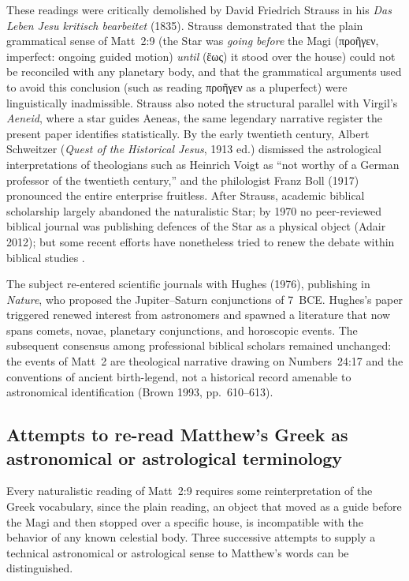 \documentclass[11pt,a4paper]{article}
\newcommand{\grk}[1]{{\fontencoding{LGR}\selectfont #1}}
\newcommand{\grk}[1]{{\greekfont #1}}
\begin{document}
These readings were critically demolished by David Friedrich Strauss in his
\textit{Das Leben Jesu kritisch bearbeitet} (1835)\cite{strauss1835}. Strauss demonstrated
that the plain grammatical sense of Matt~2:9 (the Star was \emph{going before} the Magi
(\grk{προῆγεν}, imperfect: ongoing guided motion) \emph{until} (\grk{ἕως}) it stood over
the house) could not be reconciled with any planetary body, and that the grammatical arguments
used to avoid this conclusion (such as reading \grk{προῆγεν} as a pluperfect) were linguistically
inadmissible. Strauss also noted the structural parallel with Virgil's \textit{Aeneid},
where a star guides Aeneas, the same legendary narrative register the present paper identifies
statistically. By the early twentieth century, Albert Schweitzer (\textit{Quest of the
Historical Jesus}, 1913 ed.) dismissed the astrological interpretations of theologians such
as Heinrich Voigt as ``not worthy of a German professor of the twentieth century,'' and the
philologist Franz Boll (1917)\cite{boll1917} pronounced the entire enterprise fruitless.
After Strauss, academic biblical scholarship largely abandoned the naturalistic Star;
by 1970 no peer-reviewed biblical journal was publishing defences of the Star as a physical
object (Adair 2012); but some recent efforts have nonetheless tried to renew the debate 
within biblical studies \cite{barthel2015}.

The subject re-entered scientific journals with Hughes (1976)\cite{hughes1976}, publishing in
\textit{Nature}, who proposed the Jupiter--Saturn conjunctions of 7~BCE. Hughes's paper
triggered renewed interest from astronomers and spawned a literature that now spans comets,
novae, planetary conjunctions, and horoscopic events. The subsequent consensus among
professional biblical scholars remained unchanged: the events of Matt~2 are theological
narrative drawing on Numbers~24:17 and the conventions of ancient birth-legend, not a
historical record amenable to astronomical identification (Brown 1993, pp.~610--613)\cite{brown1993}.

\subsection{Attempts to re-read Matthew's Greek as astronomical or astrological terminology}

Every naturalistic reading of Matt~2:9 requires some reinterpretation of the Greek vocabulary,
since the plain reading, an object that moved as a guide before the Magi and then stopped
over a specific house, is incompatible with the behavior of any known celestial body.
Three successive attempts to supply a technical astronomical or astrological sense to Matthew's
words can be distinguished.
\end{document}
